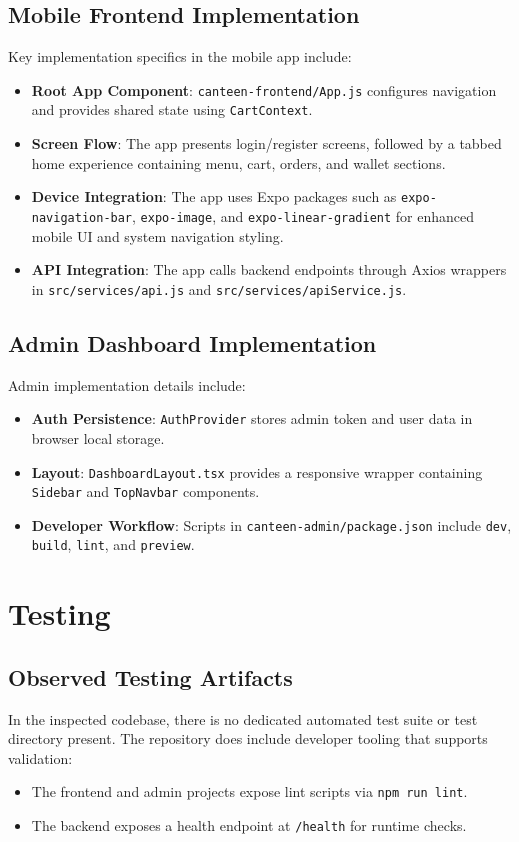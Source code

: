 \documentclass[12pt,a4paper]{report}
\begin{document}
\section{Mobile Frontend Implementation}
Key implementation specifics in the mobile app include:
\begin{itemize}
  \item \textbf{Root App Component}: \texttt{canteen-frontend/App.js} configures navigation and provides shared state using \texttt{CartContext}.
  \item \textbf{Screen Flow}: The app presents login/register screens, followed by a tabbed home experience containing menu, cart, orders, and wallet sections.
  \item \textbf{Device Integration}: The app uses Expo packages such as \texttt{expo-navigation-bar}, \texttt{expo-image}, and \texttt{expo-linear-gradient} for enhanced mobile UI and system navigation styling.
  \item \textbf{API Integration}: The app calls backend endpoints through Axios wrappers in \texttt{src/services/api.js} and \texttt{src/services/apiService.js}.
\end{itemize}

\section{Admin Dashboard Implementation}
Admin implementation details include:
\begin{itemize}
  \item \textbf{Auth Persistence}: \texttt{AuthProvider} stores admin token and user data in browser local storage.
  \item \textbf{Layout}: \texttt{DashboardLayout.tsx} provides a responsive wrapper containing \texttt{Sidebar} and \texttt{TopNavbar} components.
  \item \textbf{Developer Workflow}: Scripts in \texttt{canteen-admin/package.json} include \texttt{dev}, \texttt{build}, \texttt{lint}, and \texttt{preview}.
\end{itemize}

\chapter{Testing}
\section{Observed Testing Artifacts}
In the inspected codebase, there is no dedicated automated test suite or test directory present. The repository does include developer tooling that supports validation:
\begin{itemize}
  \item The frontend and admin projects expose lint scripts via \texttt{npm run lint}.
  \item The backend exposes a health endpoint at \texttt{/health} for runtime checks.
\end{itemize}
\end{document}
